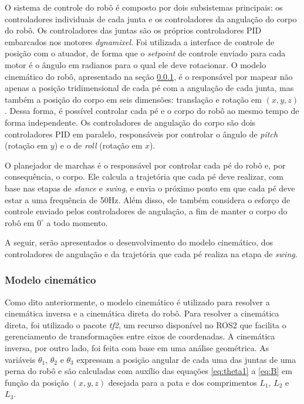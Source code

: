 \documentclass[../main.tex]{subfiles}
\begin{document}
O sistema de controle do robô é composto por dois subsistemas principais: os controladores individuais de cada junta e os controladores da angulação do corpo do robô. Os controladores das juntas são os próprios controladores PID embarcados nos motores \textit{dynamixel}. Foi utilizada a interface de controle de posição com o atuador, de forma que o \textit{setpoint} de controle enviado para cada motor é o ângulo em radianos para o qual ele deve rotacionar. O modelo cinemático do robô, apresentado na seção \ref{sec:detail_inv_kinematics}, é o responsável por mapear não apenas a posição tridimensional de cada pé com a angulação de cada junta, mas também a posição do corpo em seis dimensões: translação e rotação em $(x, y, z)$. Dessa forma, é possível controlar cada pé e o corpo do robô ao mesmo tempo de forma independente. Os controladores de angulação do corpo são dois controladores PID em paralelo, responsáveis por controlar o ângulo de \textit{pitch} (rotação em $y$) e o de \textit{roll} (rotação em $x$).

O planejador de marchas é o responsável por controlar cada pé do robô e, por consequência, o corpo. Ele calcula a trajetória que cada pé deve realizar, com base nas etapas de \textit{stance} e \textit{swing}, e envia o próximo ponto em que cada pé deve estar a uma frequência de 50Hz. Além disso, ele também considera o esforço de controle enviado pelos controladores de angulação, a fim de manter o corpo do robô em $0^{\circ}$ a todo momento.

A seguir, serão apresentados o desenvolvimento do modelo cinemático, dos controladores de angulação e da trajetória que cada pé realiza na etapa de \textit{swing}.

\subsubsection{Modelo cinemático}
\label{sec:detail_inv_kinematics}

Como dito anteriormente, o modelo cinemático é utilizado para resolver a cinemática inversa e a cinemática direta do robô. Para resolver a cinemática direta, foi utilizado o pacote \textit{tf2}, um recurso disponível no ROS2 que facilita o gerenciamento de transformações entre eixos de coordenadas. A cinemática inversa, por outro lado, foi feita com base em uma análise geométrica. As variáveis $\theta_1$, $\theta_2$ e $\theta_3$ expressam a posição angular de cada uma das juntas de uma perna do robô e são calculadas com auxílio das equações \ref{eq:theta1} a \ref{eq:B} em função da posição $(x, y, z)$ desejada para a pata e dos comprimentos $L_1$, $L_2$ e $L_3$.
\end{document}
